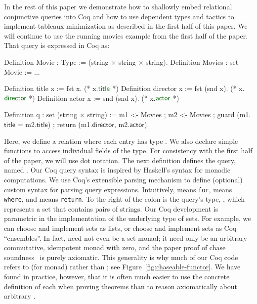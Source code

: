 \documentclass[preprint]{sigplanconf}
\begin{document}
In the rest of this paper we demonstrate how to shallowly embed relational conjunctive queries into Coq and how to use dependent types and tactics to implement tableaux minimization as described in the first half of this paper.  We will continue to use the running movies example from the first half of the paper.  That query is expressed in Coq as:
\begin{coq}
Definition Movie : Type := (string $\times$ string $\times$ string).
Definition Movies : set Movie := ...

Definition title x := fst x. (* x.$\textcolor{dkgreen}{\textsf{title}}$ *)
Definition director x := fst (snd x). (* x.$\textcolor{dkgreen}{\textsf{director}}$ *)
Definition actor x := snd (snd x). (* x.$\textcolor{dkgreen}{\textsf{actor}}$ *)

Definition q : set (string $\times$ string) :=
  m1 <- Movies ; m2 <- Movies ;
  guard (m1.$\textsf{title}$ = m2.$\textsf{title}$) ;
  return (m1.$\textsf{director}$, m2.$\textsf{actor}$).
\end{coq}
Here, we define a relation  where each entry has type .
We also declare simple functions to access individual fields of the  type. For consistency with the first half of the paper, we will use dot notation.
The next definition defines the query, named .  Our Coq query syntax is inspired by Haskell's syntax for monadic computations.
We use Coq's extensible parsing mechanism to define (optional) custom syntax for parsing query expressions. Intuitively, \coqe{<-} means {\tt for},  means {\tt where}, and  means {\tt return}.  To the right of the colon is the query's type, , which represents a set that contains pairs of strings.
Our Coq development is parametric in the implementation of the underlying type of sets.  For example, we can choose  and implement sets as lists, or choose  and implement sets as Coq ``ensembles''.  
In fact,  need not even be a set monad; it need only be an arbitrary commutative, idempotent monad with zero, and the paper proof of chase soundness~\cite{Popa99anequational} is purely axiomatic.  This generality is why much of our Coq code refers to  (for monad) rather than ; see Figure~\ref{fig:chaseable-functor}.  We have found in practice, however, that it is often much easier to use the concrete definition of each  when proving theorems than to reason axiomatically about arbitrary .    
\end{document}
